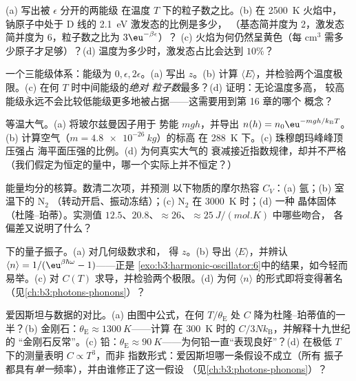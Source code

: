 \begin{exercise}[$\star$]\label{exo:b3:canonical-ensemble:1}
(a) 写出被 $\epsilon$ 分开的两能级
在温度 $T$ 下的粒子数之比。(b) 在 \qty{2500}{K} 火焰中，
钠原子中处于 D 线的 \qty{2.1}{eV} 激发态的比例是多少，
（基态简并度为 2，激发态简并度为 6，粒子数之比为
$3\eu^{-\beta\epsilon}$）？
(c) 火焰为何仍然呈黄色（每
cm$^3$ 需多少原子才足够）？(d) 温度为多少时，激发态占比会达到
$10\%$？
\end{exercise}

\begin{exercise}[$\star$]\label{exo:b3:canonical-ensemble:2}
一个三能级体系：能级为 $0, \epsilon, 2\epsilon$。(a) 写出 $z$。(b)
计算 $\langle E\rangle$，并检验两个温度极限。(c)
在何 $T$ 时中间能级的\emph{绝对
粒子数}最多？(d) 证明：无论温度多高，
较高能级永远不会比较低能级更多地被占据——这需要用到第 16 章的哪个
概念？
\end{exercise}

\begin{exercise}[$\star$]\label{exo:b3:canonical-ensemble:3}
等温大气。(a) 将玻尔兹曼因子用于
势能 $mgh$，并导出 $n(h) = n_0\eu^{-mgh/k_{\text{B}}
T}$。(b) 计算空气（$m = \qty{4.8e-26}{kg}$）的标高
在 \qty{288}{K} 下。(c) 珠穆朗玛峰峰顶压强占
海平面压强的比例。(d) 为何真实大气的
衰减接近指数规律，却并不严格（我们假定为恒定的量中，哪一个实际上并不恒定？）
\end{exercise}

\begin{exercise}[$\star$]\label{exo:b3:canonical-ensemble:4}
能量均分的核算。数清二次项，并预测
以下物质的摩尔热容 $C_V$：(a) 氩；(b) 室温下的 N$_2$
（转动开启、振动冻结）；(c) N$_2$ 在 \qty{3000}{K} 时；(d) 一种
晶体固体（杜隆–珀蒂）。实测值
$12.5$、$20.8$、$\approx26$、$\approx\qty{25}{J/(mol.K)}$ 中哪些吻合，
各偏差又说明了什么？
\end{exercise}

\begin{exercise}[$\star\star$]\label{exo:b3:canonical-ensemble:5}
下的量子振子。(a) 对几何级数求和，
得 $z$。(b) 导出 $\langle E\rangle$，并辨认 $\langle
n\rangle = 1/(\eu^{\beta\hbar\omega} - 1)$——正是
\cref{exo:b3:harmonic-oscillator:6}中的结果，如今轻而易举。(c)
对 $C(T)$ 求导，并检验两个极限。(d) 为何
$\langle n\rangle$ 的形式即将变得著名
（见\cref{ch:b3:photons-phonons}）？
\end{exercise}

\begin{exercise}[$\star\star$]\label{exo:b3:canonical-ensemble:6}
爱因斯坦与数据的对比。(a) 由图中公式，在何
$T/\theta_{\text{E}}$ 处 $C$ 降为杜隆–珀蒂值的一半？(b)
金刚石：$\theta_{\text{E}} \approx \qty{1300}{K}$——计算
在 \qty{300}{K} 时的 $C/3Nk_{\text{B}}$，并解释十九世纪的
“金刚石反常”。(c) 铅：$\theta_{\text{E}}
\approx \qty{90}{K}$——为何铅一直“表现良好”？(d)
在极低 $T$ 下的测量表明 $C \propto T^3$，而非
指数形式：爱因斯坦哪一条假设不成立（所有
振子都具有\emph{单一}频率），并由谁修正了这一假设
（见\cref{ch:b3:photons-phonons}）？
\end{exercise}

